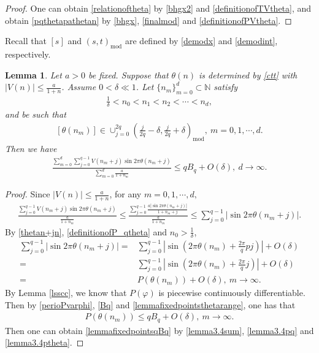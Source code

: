 \documentclass[12pt]{amsart}
\newcommand{\abs}[1]{\left\lvert #1 \right\rvert}
\theoremstyle{plain}
\newtheorem{lemma}[theorem]{Lemma}
\theoremstyle{definition}
\begin{document}
	\begin{proof}
		One can obtain \eqref{relationoftheta} by \eqref{bhgx2} and \eqref{definitionofTVtheta}, and obtain \eqref{pqthetapathetan} by \eqref{bhgx}, \eqref{finalmod} and \eqref{definitionofPVtheta}.
	\end{proof}
	
	Recall that $[s]$ and $(s,t)_{\mathrm{mod}}$ are defined by \eqref{demodx} and \eqref{demodint}, respectively.
	
	\begin{lemma}\label{lemmafixedpoints}	Let $a>0$ be fixed.
			Suppose that $\theta(n)$ is determined by \eqref{ctt} with $\abs{V(n)}\leq\frac{a}{1+n}$.  Assume $0<\delta\ll 1$. Let $\{n_m\}_{m=0}^{d}\subset\mathbb{N}$ satisfy
			\begin{align}
				\frac{1}{\delta}<n_0<n_1<n_2<\cdots<n_d,
			\end{align} 
			and be such that
			\begin{align}
				\left[\theta(n_m)\right]\in \cup_{j=0}^{2q}{\left(\frac{j}{2q}-\delta,\frac{j}{2q}+\delta\right)_{\mathrm{mod}}},\ m=0,1,\cdots,d.\label{lemmafixedpointsthetarange}
			\end{align}
		Then
		we have 
		\begin{align}\label{lemmafixedpointsqBq}
			\frac{\sum_{m=0}^{d}\sum_{j=0}^{q-1}V(n_{m}+j)\sin2\pi\theta(n_{m}+j)}{\sum_{m=0}^{d}\frac{a}{1+n_{m}}}\leq qB_q+O(\delta),\ d\to\infty.
		\end{align}
	\end{lemma}
	\begin{proof}
		Since $\abs{V(n)}\leq \frac{a}{1+n}$, for any $m=0,1,\cdots,d,$ 
		\begin{align}
	\frac{\sum_{j=0}^{q-1}V(n_{m}+j)\sin2\pi\theta(n_{m}+j)}{\frac{a}{1+n_{m}}}\leq \frac{\sum_{j=0}^{q-1}\frac{a\abs{\sin2\pi\theta(n_{m}+j)}}{1+n_m+j}}{\frac{a}{1+n_{m}}}
	\leq \sum_{j=0}^{q-1}\abs{\sin2\pi\theta(n_{m}+j)}.\label{lemma3.4sum}
			\end{align}
		By \eqref{thetan+jn}, \eqref{definitionofP_qtheta} and $n_0>\frac{1}{\delta}$, 
		\begin{align}
			\sum_{j=0}^{q-1}\abs{\sin2\pi\theta(n_{m}+j)}=&\sum_{j=0}^{q-1}\abs{\sin\left(2\pi\theta(n_m)+\frac{2\pi}{q}pj\right)}+O(\delta)\nonumber\\
			=&\sum_{j=0}^{q-1}\abs{\sin\left(2\pi\theta(n_m)+\frac{2\pi}{q}j\right)}+O(\delta)\nonumber\\
			=&P(\theta(n_m))+O(\delta), \ m\to\infty.\label{lemma3.4pq}
		\end{align}
		By Lemma \ref{lsscc}, we know that $P(\varphi)$ is piecewise continuously differentiable. Then by \eqref{perioPvarphi}, \eqref{Bq} and \eqref{lemmafixedpointsthetarange}, one has that 
		\begin{align}
			P(\theta(n_m))\leq qB_q+O(\delta),\ m\to\infty.\label{lemma3.4ptheta}
		\end{align}
		Then one can obtain \eqref{lemmafixedpointsqBq} by \eqref{lemma3.4sum}, \eqref{lemma3.4pq} and \eqref{lemma3.4ptheta}.
	\end{proof}
	
\end{document}
